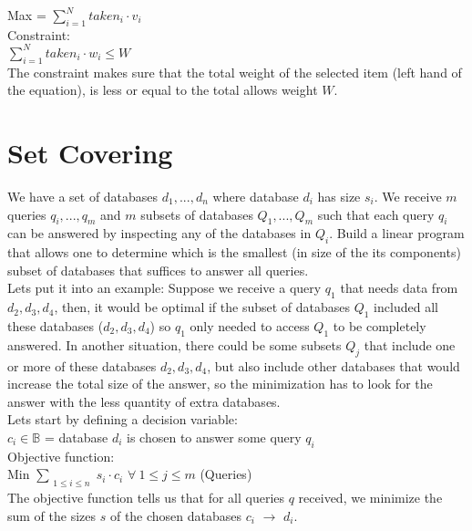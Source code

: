 \documentclass[11pt, oneside]{article}   	%
\begin{document}
Max = $\sum_{i = 1}^{N} taken_i \cdot v_i$\\

Constraint:\\

$\sum_{i = 1}^{N} taken_i \cdot w_i \leq W$\\

The constraint makes sure that the total weight of the selected item (left hand of the equation), is less or equal to the total allows weight $W$.

\section{Set Covering}
We have a set of databases $d_1, ... , d_n$ where database $d_i$ has size $s_i$. We receive $m$ queries $q_i, ... , q_m$ and $m$ subsets of databases $Q_1, ... , Q_m$ such that each query $q_i$ can be answered by inspecting any of the databases in $Q_i$. Build a linear program that allows one to determine which is the smallest (in size of the its components) subset of databases that suffices to answer all queries.\\

Lets put it into an example: Suppose we receive a query $q_1$ that needs data from $d_2, d_3, d_4$, then, it would be optimal if the subset of databases $Q_1$ included all these databases ($d_2, d_3, d_4$) so $q_1$ only needed to access $Q_1$ to be completely answered. In another situation, there could be some subsets $Q_j$ that include one or more of these databases $d_2, d_3, d_4$, but also include other databases that would increase the total size of the answer, so the minimization has to look for the answer with the less quantity of extra databases.\\

Lets start by defining a decision variable:\\

$c_i \in \mathbb{B}$ = database $d_i$ is chosen to answer some query $q_i$\\

Objective function:\\

Min $\sum_{\substack{1 \leq i \leq n}} s_i \cdot c_i$ \hspace{5 mm} $\forall{}\ 1 \leq j \leq m$ (Queries)\\

The objective function tells us that for all queries $q$ received, we minimize the sum of the sizes $s$ of the chosen databases $c_i$ $\rightarrow$  $d_i$.\\
\end{document}
